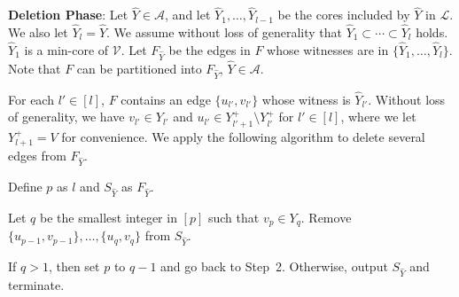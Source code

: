 \documentclass[11pt]{article}
\newcommand{\Afam}{\mathcal{A}}
\newcommand{\Vfam}{\mathcal{V}}
\newcommand{\Lfam}{\mathcal{L}}
\begin{document}
{\bf Deletion Phase}\/:
Let $\hat{Y} \in \Afam$, and let
$\hat{Y}_1,\ldots,\hat{Y}_{l-1}$ be the cores included by $\hat{Y}$
in $\Lfam$.
We also let $\hat{Y}_l=\hat{Y}$.
We assume without loss of generality that $\hat{Y}_1 \subset \cdots \subset
\hat{Y}_{l}$ holds.
$\hat{Y}_1$ is a min-core of $\Vfam$.
Let $F_{\hat{Y}}$ be the edges in $F$ whose witnesses are in 
$\{\hat{Y}_1,\ldots,\hat{Y}_{l}\}$.
Note that $F$ can be partitioned into
$F_{\hat{Y}}$, $\hat{Y}\in \Afam$.

For each $l' \in [l]$,
$F$ contains an edge
$\{u_{l'},v_{l'}\}$ whose witness is $\hat{Y}_{l'}$.
Without loss of generality, we have $v_{l'} \in Y_{l'}$ and $u_{l'} \in
Y^+_{l'+1}\setminus Y^+_{l'}$ for $l' \in [l]$,
where we let $Y^+_{l+1}=V$ for convenience.
We apply the following algorithm to delete several edges from $F_{\hat{Y}}$.

\begin{description}\setlength{\itemsep}{0pt}
 \item[Deletion algorithm]
 \item[Step 1:]
	    Define $p$ as $l$ and $S_{\hat{Y}}$ as $F_{\hat{Y}}$.
 \item[Step 2:]
	    Let $q$ be the smallest integer in $[p]$ such that 
	    $v_{p} \in Y_{q}$.
	    Remove $\{u_{p-1},v_{p-1}\}, \ldots,\{u_{q},v_{q}\}$
	    from $S_{\hat{Y}}$.
 \item[Step 3:] If $q>1$, then set $p$ to $q-1$ and go back to Step~2.
	    Otherwise, output $S_{\hat{Y}}$ and terminate.
\end{description}
\end{document}
